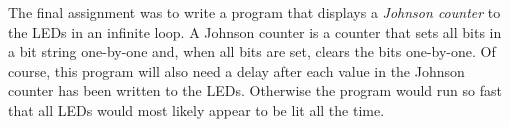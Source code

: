 The final assignment was to write a program that displays a \emph{Johnson counter} to the LEDs in an infinite loop. A Johnson counter is a counter that sets all bits in a bit string one-by-one and, when all bits are set, clears the bits one-by-one. Of course, this program will also need a delay after each value in the Johnson counter has been written to the LEDs. Otherwise the program would run so fast that all LEDs would most likely appear to be lit all the time.

